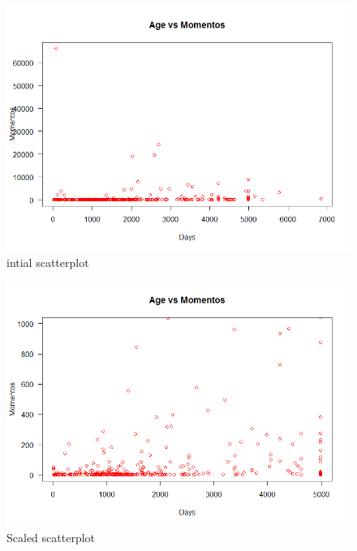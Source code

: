 \documentclass[12pt]{article}
\begin{document}
\begin{figure}[ht]
\includegraphics[scale=0.7]{../Q3/scatterDaysMomento_1}
\centering
\caption{intial scatterplot}
\label{intial-scatterplot}
\end{figure}
\newpage

\begin{figure}[ht]
\includegraphics[scale=0.7]{../Q3/scatterDaysMomento_2}
\centering
\caption{Scaled scatterplot}
\label{scaled-scatterplot}
\end{figure}
\newpage


\cite{*}
\end{document}

